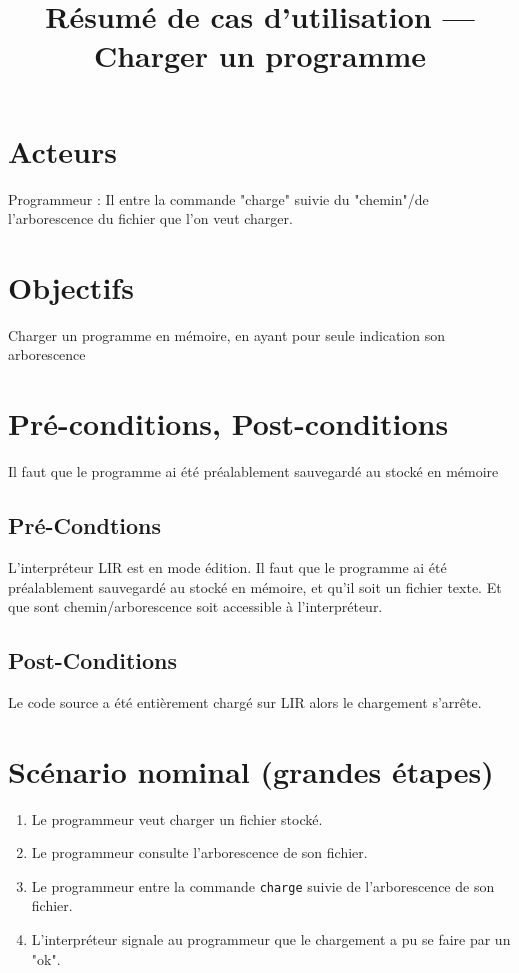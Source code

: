 \documentclass[12pt,a4paper]{article}
\title{Résumé de cas d'utilisation --- Charger un programme} %
\date{} %
\author{} %
\begin{document}
	
	\maketitle
	
	\section{Acteurs}
	Programmeur : Il entre la commande "charge" suivie du "chemin"/de l'arborescence du fichier que l'on veut charger.
	
	\section{Objectifs}
	Charger un programme en mémoire, en ayant pour seule indication son arborescence 
	
	\section{Pré-conditions, Post-conditions}
	Il faut que le programme ai été préalablement sauvegardé au stocké en mémoire
	
	\subsection{Pré-Condtions}
	L'interpréteur LIR est en mode édition. 
	Il faut que le programme ai été préalablement sauvegardé au stocké en mémoire, et qu'il soit un fichier texte.
	Et que sont chemin/arborescence soit accessible à l'interpréteur.
	
	\subsection{Post-Conditions}
	Le code source a été entièrement chargé sur LIR alors le chargement s'arrête.
	
	\section{Scénario nominal (grandes étapes)}
	\begin{enumerate}
		\item Le programmeur veut charger un fichier stocké.
		
		\item Le programmeur consulte l'arborescence de son fichier.
		
		\item Le programmeur entre la commande \verb|charge| suivie de l'arborescence de son fichier.
		
		\item L'interpréteur signale au programmeur que le chargement a pu se faire par un "ok". 
	\end{enumerate}
	
\end{document}

